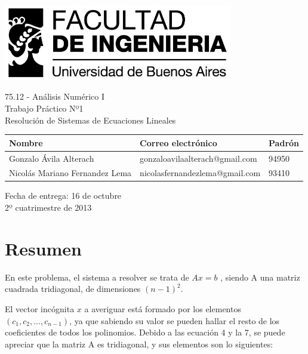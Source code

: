\documentclass[12pt,spanish]{article}
\begin{document}
\chead{}

\begin{titlepage}
\thispagestyle{empty} %

\begin{center}
	\includegraphics[width=10cm]{logo-facu-grande.jpg}
	\vfill
	
	\huge{75.12 - Análisis Numérico I} \\
	\LARGE{Trabajo Práctico Nº1 \\ Resolución de Sistemas de Ecuaciones Lineales}
	\vfill
	
	\normalsize{
	\begin{tabular}{lll}
		\textbf{Nombre} & \textbf{Correo electrónico} & \textbf{Padrón} \\ \hline 
		Gonzalo Ávila Alterach & gonzaloavilaalterach@gmail.com & 94950 \\
		Nicolás Mariano Fernandez Lema & nicolasfernandezlema@gmail.com & 93410 \\
	\end{tabular}
	}
	\vfill
		
	\large{Fecha de entrega: 16 de octubre \\ 2º cuatrimestre de 2013}
	\vfill
\end{center}
\end{titlepage}
\pagebreak

\section*{Resumen}
En este problema, el sistema a resolver se trata de $Ax=b$ , siendo A una matriz cuadrada tridiagonal, de dimensiones $(n-1)^2$.

El vector incógnita $x$ a averiguar está formado por los elementos $(c_1, c_2, ..., c_{n-1})$, ya que sabiendo su valor se pueden hallar el resto de los coeficientes de todos los polinomios.
Debido a las ecuación 4 y la 7, se puede apreciar que la matriz A es tridiagonal, y sus elementos son lo siguientes:
\end{document}
